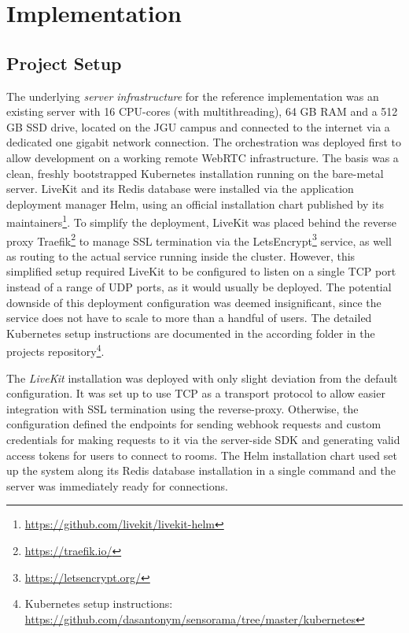 \chapter{Implementation}
\label{ch:implementation}

\section{Project Setup}

The underlying \emph{server infrastructure} for the reference implementation was an existing server with 16 \ac{CPU}-cores (with multithreading), 64 \ac{GB} \ac{RAM} and a 512 \ac{GB} \ac{SSD} drive, located on the \ac{JGU} campus and connected to the internet via a dedicated one gigabit network connection.
The orchestration was deployed first to allow development on a working remote WebRTC infrastructure.
The basis was a clean, freshly bootstrapped Kubernetes installation running on the bare-metal server.
LiveKit and its Redis database were installed via the application deployment manager Helm, using an official installation chart published by its maintainers\footnote{\url{https://github.com/livekit/livekit-helm}}.
To simplify the deployment, LiveKit was placed behind the reverse proxy Traefik\footnote{\url{https://traefik.io/}} to manage \ac{SSL} termination via the LetsEncrypt\footnote{\url{https://letsencrypt.org/}} service, as well as routing to the actual service running inside the cluster.
However, this simplified setup required LiveKit to be configured to listen on a single \ac{TCP} port instead of a range of UDP ports, as it would usually be deployed.
The potential downside of this deployment configuration was deemed insignificant, since the service does not have to scale to more than a handful of users.
The detailed Kubernetes setup instructions are documented in the according folder in the project\textquotesingle s repository\footnote{Kubernetes setup instructions: \href{https://github.com/dasantonym/sensorama/tree/master/kubernetes}{https://github.com/dasantonym/sensorama/tree/master/kubernetes}}.

The \emph{LiveKit} installation was deployed with only slight deviation from the default configuration.
It was set up to use \ac{TCP} as a transport protocol to allow easier integration with \ac{SSL} termination using the reverse-proxy.
Otherwise, the configuration defined the endpoints for sending webhook requests and custom credentials for making requests to it via the server-side \ac{SDK} and generating valid access tokens for users to connect to rooms.
The Helm installation chart used set up the system along its Redis database installation in a single command and the server was immediately ready for connections.

